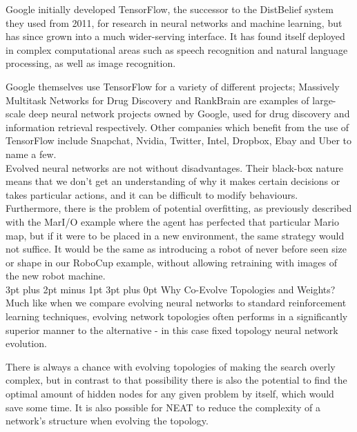 \documentclass[12pt,a4paper]{article}
\makeatletter
\renewcommand\subsection{\@startsection {subsection}{1}{2mm} %
                               {3pt plus 2pt minus 1pt} %
                               {3pt plus 0pt} %
                               {\normalfont\bfseries}}
\makeatother
\begin{document}
Google initially developed TensorFlow, the successor to the DistBelief system they used from 2011\citep{19}, for research in neural networks and machine learning\citep{17}, but has since grown into a much wider-serving interface. It has found itself deployed in complex computational areas such as speech recognition and natural language processing, as well as image recognition\citep{18}. 

Google themselves use TensorFlow for a variety of different projects;  Massively Multitask Networks for Drug Discovery and RankBrain are examples of large-scale deep neural network projects owned by Google, used for drug discovery and information retrieval respectively\citep{17}. Other companies which benefit from the use of TensorFlow include Snapchat, Nvidia, Twitter, Intel, Dropbox, Ebay and Uber to name a few. \\

Evolved neural networks are not without disadvantages. Their black-box nature means that we don't get an understanding of why it makes certain decisions or takes particular actions, and it can be difficult to modify behaviours. Furthermore, there is the problem of potential overfitting, as previously described with the MarI/O\citep{MarIO} example where the agent has perfected that particular Mario map, but if it were to be placed in a new environment, the same strategy would not suffice. It would be the same as introducing a robot of never before seen size or shape in our RoboCup\cite{24} example, without allowing retraining with images of the new robot machine.\\

\subsection{Why Co-Evolve Topologies and Weights?}
Much like when we compare evolving neural networks to standard reinforcement learning techniques, evolving network topologies often performs in a significantly superior manner to the alternative - in this case fixed topology neural network evolution\citep{EfficientEvolutionOfNeuralNetworkTopologies}. 

There is always a chance with evolving topologies of making the search overly complex, but in contrast to that possibility there is also the potential to find the optimal amount of hidden nodes for any given problem by itself, which would save some time\citep{EfficientEvolutionOfNeuralNetworkTopologies}. It is also possible for NEAT to reduce the complexity of a network's structure when evolving the topology. 
\end{document}

